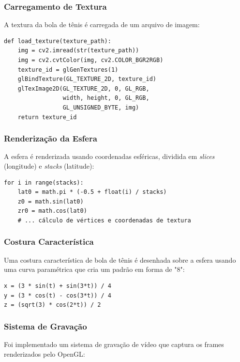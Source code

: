 \subsubsection{Carregamento de Textura}

A textura da bola de tênis é carregada de um arquivo de imagem:

\begin{lstlisting}[caption=Carregamento de textura]
def load_texture(texture_path):
    img = cv2.imread(str(texture_path))
    img = cv2.cvtColor(img, cv2.COLOR_BGR2RGB)
    texture_id = glGenTextures(1)
    glBindTexture(GL_TEXTURE_2D, texture_id)
    glTexImage2D(GL_TEXTURE_2D, 0, GL_RGB, 
                 width, height, 0, GL_RGB, 
                 GL_UNSIGNED_BYTE, img)
    return texture_id
\end{lstlisting}

\subsubsection{Renderização da Esfera}

A esfera é renderizada usando coordenadas esféricas, dividida em \textit{slices} (longitude) e \textit{stacks} (latitude):

\begin{lstlisting}[caption=Renderização da esfera texturizada]
for i in range(stacks):
    lat0 = math.pi * (-0.5 + float(i) / stacks)
    z0 = math.sin(lat0)
    zr0 = math.cos(lat0)
    # ... cálculo de vértices e coordenadas de textura
\end{lstlisting}

\subsubsection{Costura Característica}

Uma costura característica de bola de tênis é desenhada sobre a esfera usando uma curva paramétrica que cria um padrão em forma de "8":

\begin{lstlisting}[caption=Fórmula da costura]
x = (3 * sin(t) + sin(3*t)) / 4
y = (3 * cos(t) - cos(3*t)) / 4
z = (sqrt(3) * cos(2*t)) / 2
\end{lstlisting}

\subsubsection{Sistema de Gravação}

Foi implementado um sistema de gravação de vídeo que captura os frames renderizados pelo OpenGL:


